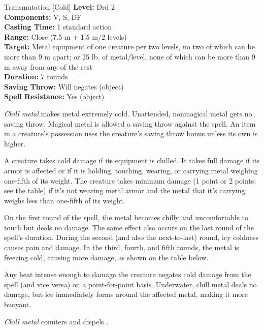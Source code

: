 {Transmutation [Cold]}
{
	\textbf{Level:}
	Drd 2\\
	\textbf{Components:}
	V, S, DF\\
	\textbf{Casting Time:}
	1 standard action\\
	\textbf{Range:}
	Close (7.5 m + 1.5 m/2 levels)\\
	\textbf{Target:}
	Metal equipment of one creature per two levels, no two of which can be more than 9 m apart; or 25 lb. of metal/level, none of which can be more than 9 m away from any of the rest\\
	\textbf{Duration:}
	7 rounds\\
	\textbf{Saving Throw:}
	Will negates (object)\\
	\textbf{Spell Resistance:}
	Yes (object)\\
}
{
	\emph{Chill metal} makes metal extremely cold. Unattended, nonmagical metal gets no saving throw. Magical metal is allowed a saving throw against the spell. An item in a creature's possession uses the creature's saving throw bonus unless its own is higher.

	A creature takes cold damage if its equipment is chilled. It takes full damage if its armor is affected or if it is holding, touching, wearing, or carrying metal weighing one-fifth of its weight. The creature takes minimum damage (1 point or 2 points; see the table) if it's not wearing metal armor and the metal that it's carrying weighs less than one-fifth of its weight.


	On the first round of the spell, the metal becomes chilly and uncomfortable to touch but deals no damage. The same effect also occurs on the last round of the spell's duration. During the second (and also the next-to-last) round, icy coldness causes pain and damage. In the third, fourth, and fifth rounds, the metal is freezing cold, causing more damage, as shown on the table below.

	Any heat intense enough to damage the creature negates cold damage from the spell (and vice versa) on a point-for-point basis. Underwater, chill metal deals no damage, but ice immediately forms around the affected metal, making it more buoyant.

	\emph{Chill metal} counters and dispels .

}
